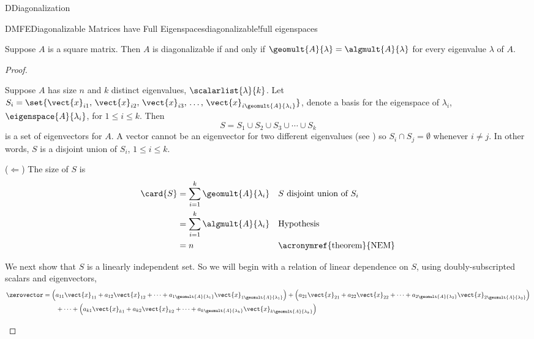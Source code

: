 \begin{subsect}{D}{Diagonalization}
%
\begin{theorem}{DMFE}{Diagonalizable Matrices have Full Eigenspaces}{diagonalizable!full eigenspaces}
\begin{para}Suppose $A$ is a square matrix.  Then $A$ is diagonalizable if and only if $\geomult{A}{\lambda}=\algmult{A}{\lambda}$ for every eigenvalue $\lambda$ of $A$.\end{para}
\end{theorem}
%
\begin{proof}
\begin{para}Suppose $A$ has size $n$ and $k$ distinct eigenvalues, $\scalarlist{\lambda}{k}$.  Let $S_i=\set{\vect{x}_{i1},\,\vect{x}_{i2},\,\vect{x}_{i3},\,\ldots,\,\vect{x}_{i\geomult{A}{\lambda_i}}}$,  denote a basis for the eigenspace of $\lambda_i$, $\eigenspace{A}{\lambda_i}$,  for $1\leq i\leq k$.  Then
%
\begin{equation*}
S=S_1\cup S_2\cup S_3\cup\cdots\cup S_k
\end{equation*}
%
is a set of eigenvectors for $A$.  A vector cannot be an eigenvector for two different eigenvalues (see ) so $S_i\cap S_j=\emptyset$ whenever $i\neq j$.  In other words, $S$ is a disjoint union of $S_i$, $1\leq i\leq k$.\end{para}
%
\begin{para}($\Leftarrow$)  The size of $S$ is
%
\begin{align*}
\card{S}
&=\sum_{i=1}^k\geomult{A}{\lambda_i}&&\text{$S$ disjoint union of $S_i$}\\
&=\sum_{i=1}^k\algmult{A}{\lambda_i}&&\text{Hypothesis}\\
&=n&&\text{\acronymref{theorem}{NEM}}
\end{align*}
\end{para}
%
\begin{para}We next show that $S$ is a linearly independent set.  So we will begin with a relation of linear dependence on $S$, using doubly-subscripted scalars and eigenvectors,
%
\begin{align*}
\zerovector&=
\left(a_{11}\vect{x}_{11}+a_{12}\vect{x}_{12}+\cdots+a_{1\geomult{A}{\lambda_1}}\vect{x}_{1\geomult{A}{\lambda_1}}\right)+
\left(a_{21}\vect{x}_{21}+a_{22}\vect{x}_{22}+\cdots+a_{2\geomult{A}{\lambda_2}}\vect{x}_{2\geomult{A}{\lambda_2}}\right)\\
&\quad\quad+\cdots+
\left(a_{k1}\vect{x}_{k1}+a_{k2}\vect{x}_{k2}+\cdots+a_{k\geomult{A}{\lambda_k}}\vect{x}_{k\geomult{A}{\lambda_k}}\right)
%
\end{align*}

\end{para}
\end{proof}
\end{subsect}
